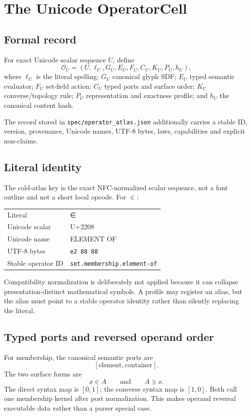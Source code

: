 \documentclass[11pt,a4paper]{article}
\begin{document}
\section{The Unicode OperatorCell}
\subsection{Formal record}
\begin{definitionbox}
For exact Unicode scalar sequence \(U\), define
\[
\mathcal{O}_{U}=(U,\ell_U,G_U,E_U,F_U,C_U,K_U,P_U,h_U),
\]
where \(\ell_U\) is the literal spelling; \(G_U\) canonical glyph SDF; \(E_U\) typed semantic evaluator; \(F_U\) set-field action; \(C_U\) typed ports and surface order; \(K_U\) converse/topology rule; \(P_U\) representation and exactness profile; and \(h_U\) the canonical content hash.
\end{definitionbox}

The record stored in \texttt{spec/operator\_atlas.json} additionally carries a stable ID, version, provenance, Unicode names, UTF-8 bytes, laws, capabilities and explicit non-claims.

\subsection{Literal identity}
The cold-atlas key is the exact NFC-normalized scalar sequence, not a font outline and not a short local opcode. For \(∈\):\par\smallskip
\begin{tabularx}{\textwidth}{P{42mm}Y}
\toprule
Literal & ∈\\
Unicode scalar & U+2208\\
Unicode name & ELEMENT OF\\
UTF-8 bytes & \texttt{e2 88 88}\\
Stable operator ID & \texttt{set.membership.element-of}\\
\bottomrule
\end{tabularx}

Compatibility normalization is deliberately not applied because it can collapse presentation-distinct mathematical symbols. A profile may register an alias, but the alias must point to a stable operator identity rather than silently replacing the literal.

\subsection{Typed ports and reversed operand order}
For membership, the canonical semantic ports are
\[
[\mathrm{element},\mathrm{container}].
\]
The two surface forms are
\[
x\in A \qquad\text{and}\qquad A\ni x.
\]
The direct syntax map is \([0,1]\); the converse syntax map is \([1,0]\). Both call one membership kernel after port normalization. This makes operand reversal executable data rather than a parser special case.
\end{document}
